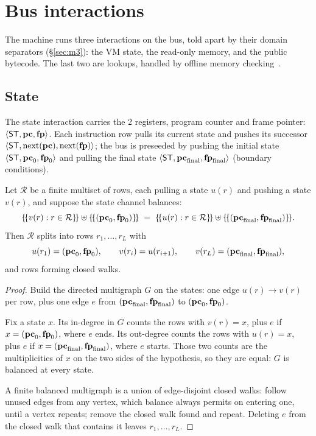\section{Bus interactions}\label{sec:omc}

The machine runs three interactions on the bus, told apart by their domain separators (\S\ref{sec:m3}): the VM state, the read-only memory, and the public bytecode. The last two are lookups, handled by offline memory checking~\cite{BEGKN94}.

\subsection{State}\label{sec:state}

The state interaction carries the 2 registers, program counter and frame pointer: $\langle \mathsf{ST},\mathbf{pc},\mathbf{fp} \rangle$. Each instruction row pulls its current state and pushes its successor $\langle \mathsf{ST},\mathrm{next}(\mathbf{pc}),\mathrm{next}(\mathbf{fp}) \rangle$; the bus is preseeded by pushing the initial state $\langle \mathsf{ST},\mathbf{pc}_0,\mathbf{fp}_0 \rangle$ and pulling the final state $\langle \mathsf{ST},\mathbf{pc}_{\mathrm{final}},\mathbf{fp}_{\mathrm{final}} \rangle$ (boundary conditions).
\begin{proposition}\label{prop:walk}
Let $\mathcal R$ be a finite multiset of rows, each pulling a state $u(r)$ and pushing a state $v(r)$, and suppose the state channel balances:
\[
  \mset{v(r):r\in\mathcal R}\uplus\mset{(\pc_0,\fp_0)}
  \;=\;\mset{u(r):r\in\mathcal R}\uplus\mset{(\pc_{\mathrm{final}},\fp_{\mathrm{final}})} .
\]
Then $\mathcal R$ splits into rows $r_1,\dots,r_L$ with
\[
  u(r_1)=(\mathbf{pc}_0,\mathbf{fp}_0),\qquad v(r_i)=u(r_{i+1}),\qquad v(r_L)=(\mathbf{pc}_{\mathrm{final}},\mathbf{fp}_{\mathrm{final}}),
\]
and rows forming closed walks.
\end{proposition}

\begin{proof}
Build the directed multigraph $G$ on the states: one edge $u(r)\to v(r)$ per row, plus one edge $e$ from $(\mathbf{pc}_{\mathrm{final}},\mathbf{fp}_{\mathrm{final}})$ to $(\mathbf{pc}_0,\mathbf{fp}_0)$.

Fix a state $x$. Its in-degree in $G$ counts the rows with $v(r)=x$, plus $e$ if $x=(\mathbf{pc}_0,\mathbf{fp}_0)$, where $e$ ends. Its out-degree counts the rows with $u(r)=x$, plus $e$ if $x=(\mathbf{pc}_{\mathrm{final}},\mathbf{fp}_{\mathrm{final}})$, where $e$ starts. Those two counts are the multiplicities of $x$ on the two sides of the hypothesis, so they are equal: $G$ is balanced at every state.

A finite balanced multigraph is a union of edge-disjoint closed walks: follow unused edges from any vertex, which balance always permits on entering one, until a vertex repeats; remove the closed walk found and repeat. Deleting $e$ from the closed walk that contains it leaves $r_1,\dots,r_L$.
\end{proof}

